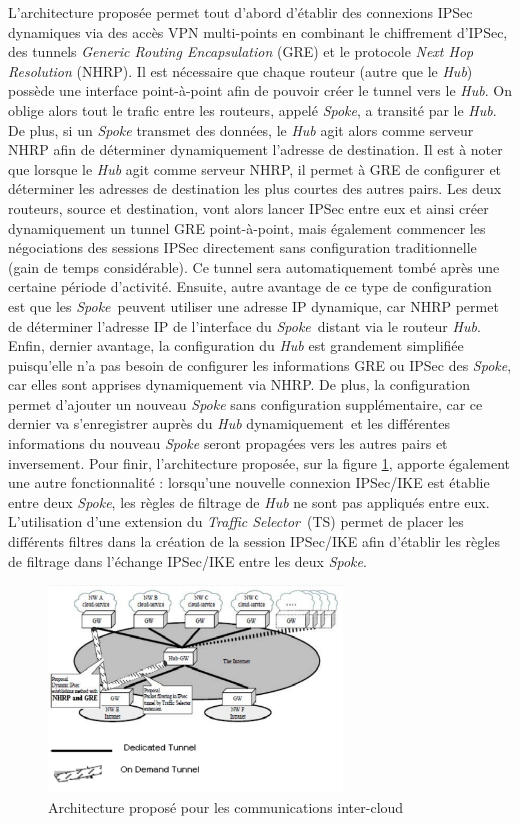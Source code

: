 L'architecture proposée permet tout d'abord d'établir des connexions IPSec dynamiques via des accès VPN multi-points en combinant le chiffrement d'IPSec, des tunnels \textit{Generic Routing Encapsulation} (\gls{GRE}) et le protocole \textit{Next Hop Resolution} (\gls{NHRP}). Il est nécessaire que chaque routeur (autre que le \textit{Hub}) possède une interface point-à-point afin de pouvoir créer le tunnel vers le \textit{Hub}. On oblige alors tout le trafic entre les routeurs, appelé \textit{Spoke}, a transité par le \textit{Hub}. De plus, si un \textit{Spoke} transmet des données, le \textit{Hub} agit alors comme serveur NHRP afin de déterminer dynamiquement l'adresse de destination. Il est à noter que lorsque le \textit{Hub} agit comme serveur NHRP, il permet à GRE de configurer et déterminer les adresses de destination les plus courtes des autres pairs. Les deux routeurs, source et destination, vont alors lancer IPSec entre eux et ainsi créer dynamiquement un tunnel GRE point-à-point, mais également commencer les négociations des sessions IPSec directement sans configuration traditionnelle (gain de temps considérable). Ce tunnel sera automatiquement tombé après une certaine période d'activité. Ensuite, autre avantage de ce type de configuration est que les \textit{Spoke} peuvent utiliser une adresse IP dynamique, car NHRP permet de déterminer l'adresse IP de l'interface du \textit{Spoke} distant via le routeur \textit{Hub}. Enfin, dernier avantage, la configuration du \textit{Hub} est grandement simplifiée puisqu'elle n'a pas besoin de configurer les informations GRE ou IPSec des \textit{Spoke}, car elles sont apprises dynamiquement via NHRP. De plus, la configuration permet d'ajouter un nouveau \textit{Spoke} sans configuration supplémentaire, car ce dernier va s'enregistrer auprès du \textit{Hub} dynamiquement et les différentes informations du nouveau \textit{Spoke} seront propagées vers les autres pairs et inversement. Pour finir, l'architecture proposée, sur la figure \ref{label-image4}, apporte également une autre fonctionnalité : lorsqu'une nouvelle connexion IPSec/IKE est établie entre deux \textit{Spoke}, les règles de filtrage de \textit{Hub} ne sont pas appliqués entre eux. L'utilisation d'une extension du \textit{Traffic Selector} (TS) permet de placer les différents filtres dans la création de la session IPSec/IKE afin d'établir les règles de filtrage dans l'échange IPSec/IKE entre les deux \textit{Spoke}.

\begin{figure}[h]
	\center
	\includegraphics[height=5.5cm]{./pics/inter_cloud_architecture.png}
	\caption{Architecture proposé pour les communications inter-cloud \cite{archi_inter}}
	\label{label-image4}
\end{figure}

